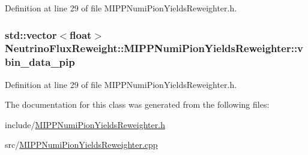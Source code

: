 Definition at line 29 of file M\-I\-P\-P\-Numi\-Pion\-Yields\-Reweighter.\-h.

\hypertarget{class_neutrino_flux_reweight_1_1_m_i_p_p_numi_pion_yields_reweighter_a2120bbeea3e8b080eb68cd8ef6aa5b8e}{
\subsubsection[{vbin\-\_\-data\-\_\-pip}]{\setlength{\rightskip}{0pt plus 5cm}std\-::vector$<$float$>$ Neutrino\-Flux\-Reweight\-::\-M\-I\-P\-P\-Numi\-Pion\-Yields\-Reweighter\-::vbin\-\_\-data\-\_\-pip\hspace{0.3cm}{\ttfamily [private]}}}\label{class_neutrino_flux_reweight_1_1_m_i_p_p_numi_pion_yields_reweighter_a2120bbeea3e8b080eb68cd8ef6aa5b8e}


Definition at line 29 of file M\-I\-P\-P\-Numi\-Pion\-Yields\-Reweighter.\-h.



The documentation for this class was generated from the following files\-:\begin{DoxyCompactItemize}
\item 
include/\hyperlink{_m_i_p_p_numi_pion_yields_reweighter_8h}{M\-I\-P\-P\-Numi\-Pion\-Yields\-Reweighter.\-h}\item 
src/\hyperlink{_m_i_p_p_numi_pion_yields_reweighter_8cpp}{M\-I\-P\-P\-Numi\-Pion\-Yields\-Reweighter.\-cpp}\end{DoxyCompactItemize}
